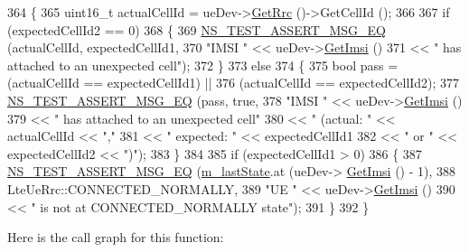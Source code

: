 \begin{DoxyCode}
364 \{
365   uint16\_t actualCellId = ueDev->\hyperlink{classns3_1_1LteUeNetDevice_a1f84e8e99aeb10f4242bbfc7b57a8128}{GetRrc} ()->GetCellId ();
366 
367   \textcolor{keywordflow}{if} (expectedCellId2 == 0)
368     \{
369       \hyperlink{group__testing_ga2a9d78cffb3db8e867c35fff0b698cf5}{NS\_TEST\_ASSERT\_MSG\_EQ} (actualCellId, expectedCellId1,
370                              \textcolor{stringliteral}{"IMSI "} << ueDev->\hyperlink{classns3_1_1LteUeNetDevice_a673405bfed4b45c5714f17b0c3bad334}{GetImsi} ()
371                                      << \textcolor{stringliteral}{" has attached to an unexpected cell"});
372     \}
373   \textcolor{keywordflow}{else}
374     \{
375       \textcolor{keywordtype}{bool} pass = (actualCellId == expectedCellId1) ||
376         (actualCellId == expectedCellId2);
377       \hyperlink{group__testing_ga2a9d78cffb3db8e867c35fff0b698cf5}{NS\_TEST\_ASSERT\_MSG\_EQ} (pass, \textcolor{keyword}{true},
378                              \textcolor{stringliteral}{"IMSI "} << ueDev->\hyperlink{classns3_1_1LteUeNetDevice_a673405bfed4b45c5714f17b0c3bad334}{GetImsi} ()
379                                      << \textcolor{stringliteral}{" has attached to an unexpected cell"}
380                                      << \textcolor{stringliteral}{" (actual: "} << actualCellId << \textcolor{stringliteral}{","}
381                                      << \textcolor{stringliteral}{" expected: "} << expectedCellId1
382                                      << \textcolor{stringliteral}{" or "} << expectedCellId2 << \textcolor{stringliteral}{")"});
383     \}
384 
385   \textcolor{keywordflow}{if} (expectedCellId1 > 0)
386     \{
387       \hyperlink{group__testing_ga2a9d78cffb3db8e867c35fff0b698cf5}{NS\_TEST\_ASSERT\_MSG\_EQ} (\hyperlink{classLteCellSelectionTestCase_a1a501f3fc32e3ff1f46f0cbf326d2661}{m\_lastState}.at (ueDev->
      \hyperlink{classns3_1_1LteUeNetDevice_a673405bfed4b45c5714f17b0c3bad334}{GetImsi} () - 1),
388                              LteUeRrc::CONNECTED\_NORMALLY,
389                              \textcolor{stringliteral}{"UE "} << ueDev->\hyperlink{classns3_1_1LteUeNetDevice_a673405bfed4b45c5714f17b0c3bad334}{GetImsi} ()
390                                    << \textcolor{stringliteral}{" is not at CONNECTED\_NORMALLY state"});
391     \}
392 \}
\end{DoxyCode}


Here is the call graph for this function\+:




